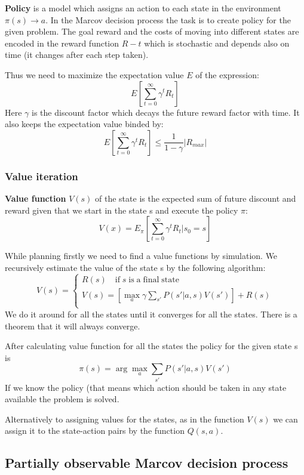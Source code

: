 \documentclass[a4paper,10pt]{article}
\begin{document}
\textbf{Policy} is a model which assigns an action to each state in the environment $\pi(s)\rightarrow a$. In the Marcov decision process the task is to create policy for the given problem. The goal reward and the costs of moving into different states are encoded in the reward function $R-t$ which is stochastic and depends also on time (it changes after each step taken). 

Thus we need to maximize the expectation value $E$ of the expression:
\[ E \left[ \sum_{t=0}^{\infty} \gamma^t R_t \right] \]
Here $\gamma$ is the discount factor which decays the future reward factor with time. It also keeps the expectation value binded by:
\[  E \left[ \sum_{t=0}^{\infty} \gamma^t R_t \right] \leq \frac{1}{1-\gamma} |R_{max}|\]

\subsubsection{Value iteration}

\textbf{Value function} $V(s)$ of the state is the expected sum of future discount and reward given that we start in the state s and execute the policy $\pi$:
\[ V(x) = E_{\pi} \left[ \sum_{t=0}^{\infty} \gamma^t R_t | s_0 = s \right] \]

While planning firstly we need to find a value functions by simulation. We recursively estimate the value of the state s by the following algorithm:
\[
  V(s) = \left\{ 
  \begin{array}{l}
   R(s) \quad  \mathrm{if\; } s \mathrm{ \; is \; a \; final \; state} \\
   V(s) = \left[ \max_a \gamma \sum_{s'} P(s'|a,s)V(s') \right] + R(s) \\
  \end{array} \right.
\]
We do it around for all the states until it converges for all the states. There is a theorem that it will always converge.

After calculating value function for all the states the policy for the given state s is
\[ \pi (s) = \arg\max_{a} \sum_{s'} P(s'|a,s)V(s') \]
If we know the policy (that means which action should be taken in any state available the problem is solved.

Alternatively to assigning values for the states, as in the function $V(s)$ we can assign it to the state-action pairs by the function $Q(s,a)$. 

\subsection{Partially observable Marcov decision process}
\end{document}
